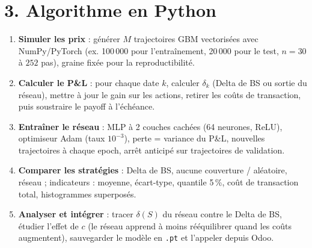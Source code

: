 \documentclass[10.5pt,a4paper]{article}
\begin{document}
\section*{3. Algorithme en Python}
\begin{enumerate}
\item \textbf{Simuler les prix} : générer $M$ trajectoires GBM vectorisées avec NumPy/PyTorch (ex. 100\,000 pour l'entraînement, 20\,000 pour le test, $n=30$ à $252$ pas), graine fixée pour la reproductibilité.
\item \textbf{Calculer le P\&L} : pour chaque date $k$, calculer $\delta_k$ (Delta de BS ou sortie du réseau), mettre à jour le gain sur les actions, retirer les coûts de transaction, puis soustraire le payoff à l'échéance.
\item \textbf{Entraîner le réseau} : MLP à 2 couches cachées (64 neurones, ReLU), optimiseur Adam (taux $10^{-3}$), perte = variance du P\&L, nouvelles trajectoires à chaque epoch, arrêt anticipé sur trajectoires de validation.
\item \textbf{Comparer les stratégies} : Delta de BS, aucune couverture / aléatoire, réseau ; indicateurs : moyenne, écart-type, quantile 5\,\%, coût de transaction total, histogrammes superposés.
\item \textbf{Analyser et intégrer} : tracer $\delta(S)$ du réseau contre le Delta de BS, étudier l'effet de $c$ (le réseau apprend à moins rééquilibrer quand les coûts augmentent), sauvegarder le modèle en \texttt{.pt} et l'appeler depuis Odoo.
\end{enumerate}
\end{document}

